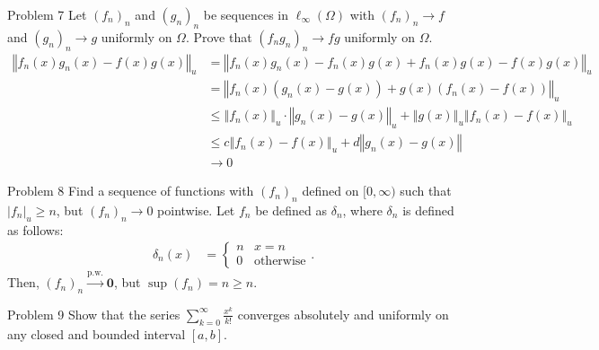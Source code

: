 \documentclass[8pt]{extarticle}
\renewcommand{\mathbf}[1]{\mathbold{#1}}
\begin{document}
  \begin{problem}{Problem 7}
    Let $(f_n)_n$ and $(g_n)_n$ be sequences in $\ell_{\infty}(\Omega)$ with $(f_n)_n \rightarrow f$ and $(g_n)_n \rightarrow g$ uniformly on $\Omega$. Prove that $(f_ng_n)_n \rightarrow fg$ uniformly on $\Omega$.
    \tcblower
    \begin{align*}
      \left\Vert f_n(x)g_n(x) - f(x)g(x)\right\Vert_u &= \left\Vert f_n(x)g_n(x) - f_n(x)g(x) + f_n(x)g(x) - f(x)g(x)\right\Vert_u\\
                                                      &= \left\Vert f_n(x)\left(g_n(x) - g(x)\right) + g(x)\left(f_n(x)-f(x)\right)\right\Vert_u\\
                                                      &\leq \left\Vert f_n(x)\right\Vert_u \cdot \left\Vert g_n(x) - g(x)\right\Vert_u + \left\Vert g(x)\right\Vert_u\left\Vert f_n(x) - f(x)\right\Vert_u \tag*{Triangle Inequality}\\
                                                      &\leq c\left\Vert f_n(x) - f(x)\right\Vert_u + d\left\Vert g_n(x) - g(x)\right\Vert \tag*{Definition of Supremum}\\
                                                      &\rightarrow 0
    \end{align*}
  \end{problem}
  \begin{problem}{Problem 8}
    Find a sequence of functions with $(f_n)_n$ defined on $[0,\infty)$ such that $\left|f_n\right|_u \geq n$, but $(f_n)_n \rightarrow 0$ pointwise.
    \tcblower
    Let $f_n$ be defined as $\delta_n$, where $\delta_n$ is defined as follows:
    \begin{align*}
      \delta_n(x) &= \begin{cases}
        n & x=n\\
        0 & \text{otherwise}
      \end{cases}.
    \end{align*}
    Then, $(f_n)_n \xrightarrow{\text{p.w.}} \mathbf{0}$, but $\sup(f_n) = n \geq n$.
  \end{problem}
  \begin{problem}{Problem 9}
    Show that the series $\sum_{k=0}^{\infty}\frac{x^k}{k!}$ converges absolutely and uniformly on any closed and bounded interval $[a,b]$.
    \tcblower

  \end{problem}
\end{document}
